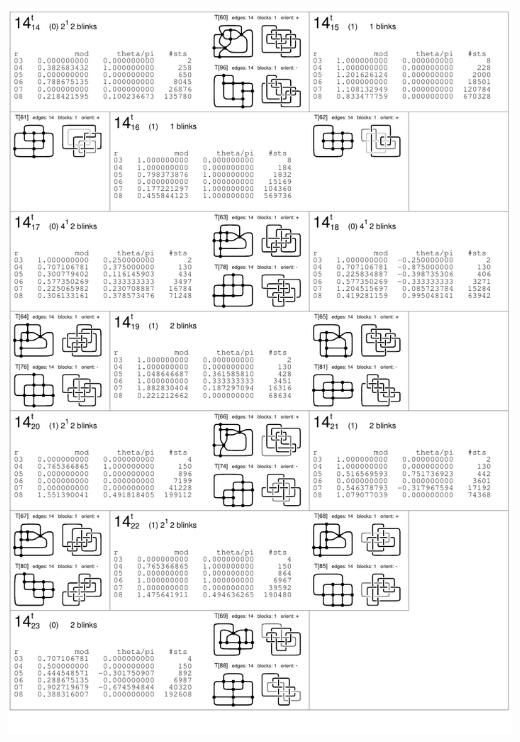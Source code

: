 \begin{center}
 \includegraphics[height=23.5cm]{E.figsbw2/con3catalog005_bw.pdf} \eject

\end{center}
